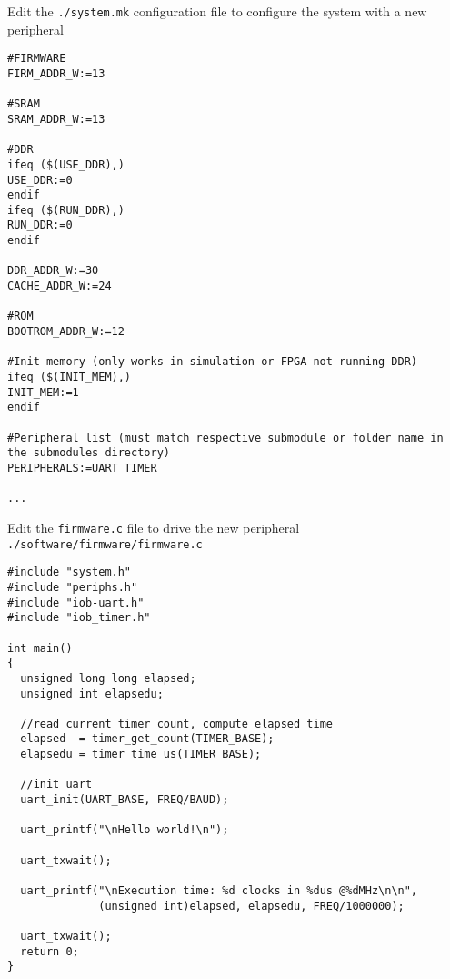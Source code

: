 \documentclass [xcolor=svgnames, t] {beamer}
\begin{document}
\begin{frame}[fragile]{Edit the {\tt ./system.mk} configuration file to configure the system with a new peripheral}
\begin{tiny}
\begin{lstlisting}
#FIRMWARE
FIRM_ADDR_W:=13

#SRAM
SRAM_ADDR_W:=13

#DDR
ifeq ($(USE_DDR),)
USE_DDR:=0
endif
ifeq ($(RUN_DDR),)
RUN_DDR:=0
endif

DDR_ADDR_W:=30
CACHE_ADDR_W:=24

#ROM
BOOTROM_ADDR_W:=12

#Init memory (only works in simulation or FPGA not running DDR)
ifeq ($(INIT_MEM),)
INIT_MEM:=1
endif

#Peripheral list (must match respective submodule or folder name in the submodules directory)
PERIPHERALS:=UART TIMER

...
\end{lstlisting}
\end{tiny}
\end{frame}



\begin{frame}[fragile]{Edit the {\tt firmware.c} file to drive the new peripheral}
  {\tt ./software/firmware/firmware.c}
  \begin{tiny}
    \begin{lstlisting}
#include "system.h"
#include "periphs.h"
#include "iob-uart.h"
#include "iob_timer.h"

int main()
{
  unsigned long long elapsed;
  unsigned int elapsedu;

  //read current timer count, compute elapsed time
  elapsed  = timer_get_count(TIMER_BASE);
  elapsedu = timer_time_us(TIMER_BASE);

  //init uart 
  uart_init(UART_BASE, FREQ/BAUD);

  uart_printf("\nHello world!\n");
  
  uart_txwait();

  uart_printf("\nExecution time: %d clocks in %dus @%dMHz\n\n", 
              (unsigned int)elapsed, elapsedu, FREQ/1000000);

  uart_txwait();
  return 0;
}
\end{lstlisting}
\end{tiny}
\end{frame}
\end{document}
